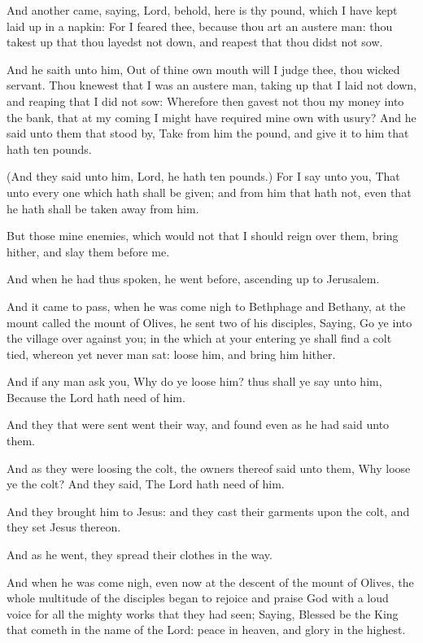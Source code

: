 \Verse And another came, saying, Lord, behold, here is thy pound, which I have kept laid up in a napkin: \Verse For I feared thee, because thou art an austere man: thou takest up that thou layedst not down, and reapest that thou didst not sow.

\Verse And he saith unto him, Out of thine own mouth will I judge thee, thou wicked servant. Thou knewest that I was an austere man, taking up that I laid not down, and reaping that I did not sow: \Verse Wherefore then gavest not thou my money into the bank, that at my coming I might have required mine own with usury?  \Verse And he said unto them that stood by, Take from him the pound, and give it to him that hath ten pounds.

\Verse (And they said unto him, Lord, he hath ten pounds.)  \Verse For I say unto you, That unto every one which hath shall be given; and from him that hath not, even that he hath shall be taken away from him.

\Verse But those mine enemies, which would not that I should reign over them, bring hither, and slay them before me.

\Verse And when he had thus spoken, he went before, ascending up to Jerusalem.

\Verse And it came to pass, when he was come nigh to Bethphage and Bethany, at the mount called the mount of Olives, he sent two of his disciples, \Verse Saying, Go ye into the village over against you; in the which at your entering ye shall find a colt tied, whereon yet never man sat: loose him, and bring him hither.

\Verse And if any man ask you, Why do ye loose him? thus shall ye say unto him, Because the Lord hath need of him.

\Verse And they that were sent went their way, and found even as he had said unto them.

\Verse And as they were loosing the colt, the owners thereof said unto them, Why loose ye the colt?  \Verse And they said, The Lord hath need of him.

\Verse And they brought him to Jesus: and they cast their garments upon the colt, and they set Jesus thereon.

\Verse And as he went, they spread their clothes in the way.

\Verse And when he was come nigh, even now at the descent of the mount of Olives, the whole multitude of the disciples began to rejoice and praise God with a loud voice for all the mighty works that they had seen; \Verse Saying, Blessed be the King that cometh in the name of the Lord: peace in heaven, and glory in the highest.

